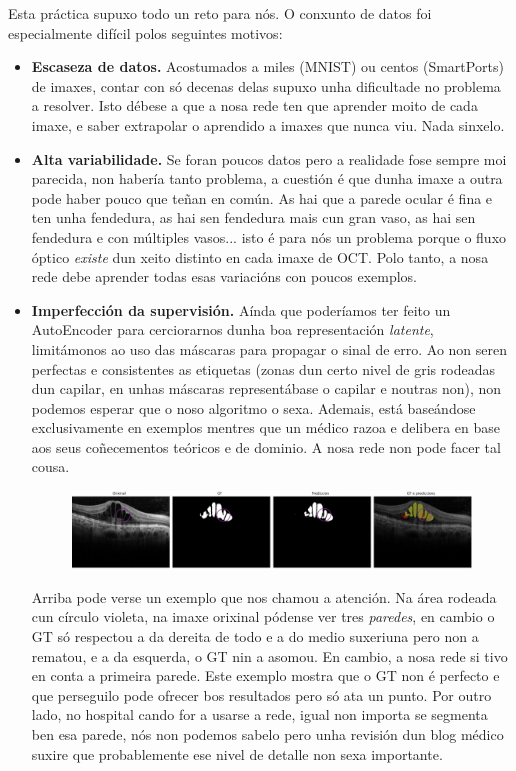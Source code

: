 \documentclass{article}
\begin{document}
Esta práctica supuxo todo un reto para nós. O conxunto de datos foi especialmente difícil polos seguintes motivos:
\begin{itemize}
	\item \textbf{Escaseza de datos.} Acostumados a miles (MNIST) ou centos (SmartPorts) de imaxes, contar con só decenas delas supuxo unha dificultade no problema a resolver. Isto débese a que a nosa rede ten que aprender moito de cada imaxe, e saber extrapolar o aprendido a imaxes que nunca viu. Nada sinxelo.
	\item \textbf{Alta variabilidade.} Se foran poucos datos pero a realidade fose sempre moi parecida, non habería tanto problema, a cuestión é que dunha imaxe a outra pode haber pouco que teñan en común. As hai que a parede ocular é fina e ten unha fendedura, as hai sen fendedura mais cun gran vaso, as hai sen fendedura e con múltiples vasos... isto é para nós un problema porque o fluxo óptico \emph{existe} dun xeito distinto en cada imaxe de OCT. Polo tanto, a nosa rede debe aprender todas esas variacións con poucos exemplos.
	\item \textbf{Imperfección da supervisión.} Aínda que poderíamos ter feito un AutoEncoder para cerciorarnos dunha boa representación \emph{latente}, limitámonos ao uso das máscaras para propagar o sinal de erro. Ao non seren perfectas e consistentes as etiquetas (zonas dun certo nivel de gris rodeadas dun capilar, en unhas máscaras representábase o capilar e noutras non), non podemos esperar que o noso algoritmo o sexa. Ademais, está baseándose exclusivamente en exemplos mentres que un médico razoa e delibera en base aos seus coñecementos teóricos e de dominio. A nosa rede non pode facer tal cousa.


\begin{figure}[H]
	\centering
	\includegraphics[width=\linewidth]{figuras/defecto_medico.png}
	\label{fig:defecto_medico}
\end{figure}

Arriba pode verse un exemplo que nos chamou a atención. Na área rodeada cun círculo violeta, na imaxe orixinal pódense ver tres \emph{paredes}, en cambio o GT só respectou a da dereita de todo e a do medio suxeriuna pero non a rematou, e a da esquerda, o GT nin a asomou. En cambio, a nosa rede si tivo en conta a primeira parede. Este exemplo mostra que o GT non é perfecto e que perseguilo pode ofrecer bos resultados pero só ata un punto. Por outro lado, no hospital cando for a usarse a rede, igual non importa se segmenta ben esa parede, nós non podemos sabelo pero unha revisión dun blog médico \cite{paxinaOCT} suxire que probablemente ese nivel de detalle non sexa importante.

\end{itemize}
\end{document}
